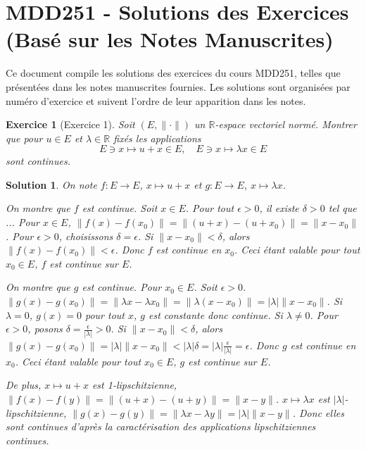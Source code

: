 \documentclass{article}
\newtheorem{solution}{Solution}
\newtheorem{exercise}{Exercice} %
\begin{document}
\sloppy

\section*{MDD251 - Solutions des Exercices (Basé sur les Notes Manuscrites)}

Ce document compile les solutions des exercices du cours MDD251, telles que présentées dans les notes manuscrites fournies. Les solutions sont organisées par numéro d'exercice et suivent l'ordre de leur apparition dans les notes.

\begin{exercise}[Exercice 1]
Soit $(E, \| \cdot \|)$ un $\mathbb{R}$-espace vectoriel normé. Montrer que pour $u \in E$ et $\lambda \in \mathbb{R}$ fixés les applications
\[ E \ni x \mapsto u + x \in E, \quad E \ni x \mapsto \lambda x \in E \]
sont continues.
\end{exercise}

\begin{solution}
On note $f: E \to E$, $x \mapsto u+x$ et $g: E \to E$, $x \mapsto \lambda x$.

On montre que $f$ est continue.
Soit $x \in E$.
Pour tout $\epsilon > 0$, il existe $\delta > 0$ tel que ...
Pour $x \in E$, $\| f(x) - f(x_0) \| = \| (u+x) - (u+x_0) \| = \| x - x_0 \|$.
Pour $\epsilon > 0$, choisissons $\delta = \epsilon$. Si $\|x-x_0\| < \delta$, alors $\|f(x) - f(x_0)\| < \epsilon$.
Donc $f$ est continue en $x_0$.
Ceci étant valable pour tout $x_0 \in E$, $f$ est continue sur $E$.

On montre que $g$ est continue.
Pour $x_0 \in E$. Soit $\epsilon > 0$.
$\| g(x) - g(x_0) \| = \| \lambda x - \lambda x_0 \| = \| \lambda (x - x_0) \| = |\lambda| \| x - x_0 \|$.
Si $\lambda = 0$, $g(x) = 0$ pour tout $x$, $g$ est constante donc continue.
Si $\lambda \neq 0$. Pour $\epsilon > 0$, posons $\delta = \frac{\epsilon}{|\lambda|} > 0$.
Si $\|x - x_0\| < \delta$, alors $\|g(x) - g(x_0)\| = |\lambda| \|x - x_0\| < |\lambda| \delta = |\lambda| \frac{\epsilon}{|\lambda|} = \epsilon$.
Donc $g$ est continue en $x_0$.
Ceci étant valable pour tout $x_0 \in E$, $g$ est continue sur $E$.

De plus, $x \mapsto u+x$ est 1-lipschitzienne, $\| f(x) - f(y) \| = \| (u+x) - (u+y) \| = \| x - y \|$.
$x \mapsto \lambda x$ est $|\lambda|$-lipschitzienne, $\| g(x) - g(y) \| = \| \lambda x - \lambda y \| = |\lambda| \| x - y \|$.
Donc elles sont continues d'après la caractérisation des applications lipschitziennes continues.
\end{solution}
\end{document}
